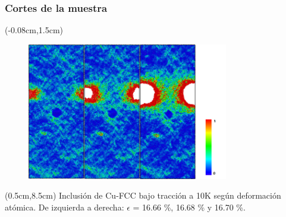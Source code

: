 \begin{frame}
  \frametitle{Cortes de la muestra}
  \begin{textblock*}{12.6cm}(-0.08cm,1.5cm) 
    \begin{figure}[htp]
     \centering
     \includegraphics[height=6cm]{../Presentacion/Nanoparticles/cuSphereTension_10K_Snapshots.png}
    \end{figure}
  \end{textblock*}
  \begin{textblock*}{12cm}(0.5cm,8.5cm) 
    \centering
      \small{Inclusi\'on de Cu-FCC bajo tracci\'on a 10K según deformaci\'on atómica. De izquierda a derecha: $\epsilon$ = 16.66 \%, 16.68 \% y 16.70 \%.}
    \end{textblock*}

\end{frame}


